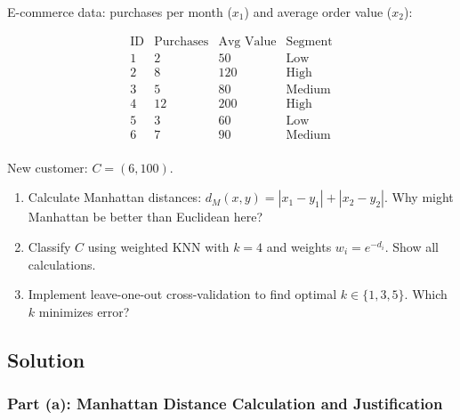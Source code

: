 \documentclass[12pt]{article}
\begin{document}
E-commerce data: purchases per month (\(x_1\)) and average order value (\(x_2\)):

\[\begin{array}{c|cc|c}
\text{ID} & \text{Purchases} & \text{Avg Value} & \text{Segment} \\
\hline
1 & 2 & 50 & \text{Low} \\
2 & 8 & 120 & \text{High} \\
3 & 5 & 80 & \text{Medium} \\
4 & 12 & 200 & \text{High} \\
5 & 3 & 60 & \text{Low} \\
6 & 7 & 90 & \text{Medium} \\
\end{array}\]

New customer: \(C = (6, 100)\).

\begin{enumerate}
\item[(a)] Calculate Manhattan distances: \(d_M(x,y) = |x_1-y_1| + |x_2-y_2|\). Why might Manhattan be better than Euclidean here?
\item[(b)] Classify \(C\) using weighted KNN with \(k=4\) and weights \(w_i = e^{-d_i}\). Show all calculations.
\item[(c)] Implement leave-one-out cross-validation to find optimal \(k \in \{1,3,5\}\). Which \(k\) minimizes error?
\end{enumerate}

\subsection{Solution}

\subsubsection{Part (a): Manhattan Distance Calculation and Justification}
\end{document}
